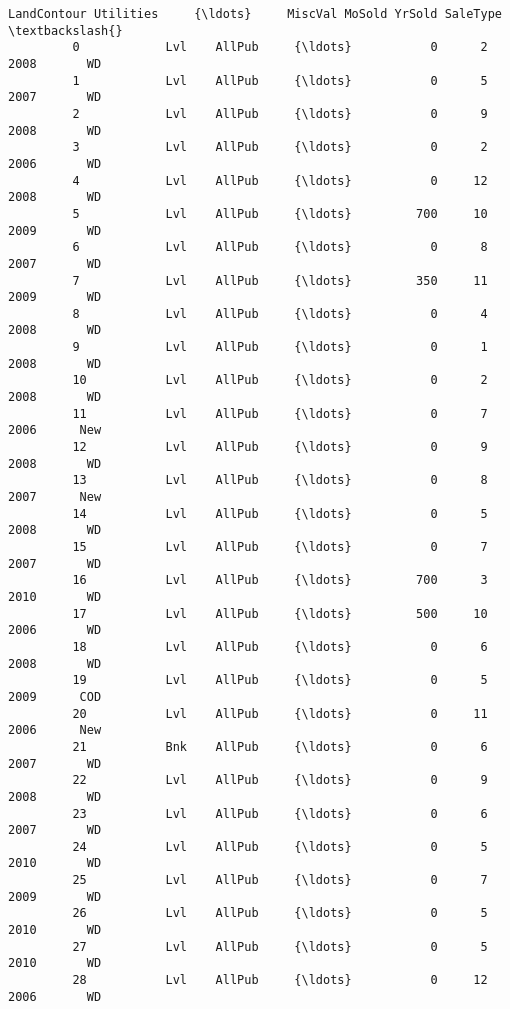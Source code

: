 \documentclass[11pt]{article}
\begin{document}
\begin{Verbatim}[commandchars=\\\{\}]
              LandContour Utilities     {\ldots}     MiscVal MoSold YrSold SaleType  \textbackslash{}
         0            Lvl    AllPub     {\ldots}           0      2   2008       WD   
         1            Lvl    AllPub     {\ldots}           0      5   2007       WD   
         2            Lvl    AllPub     {\ldots}           0      9   2008       WD   
         3            Lvl    AllPub     {\ldots}           0      2   2006       WD   
         4            Lvl    AllPub     {\ldots}           0     12   2008       WD   
         5            Lvl    AllPub     {\ldots}         700     10   2009       WD   
         6            Lvl    AllPub     {\ldots}           0      8   2007       WD   
         7            Lvl    AllPub     {\ldots}         350     11   2009       WD   
         8            Lvl    AllPub     {\ldots}           0      4   2008       WD   
         9            Lvl    AllPub     {\ldots}           0      1   2008       WD   
         10           Lvl    AllPub     {\ldots}           0      2   2008       WD   
         11           Lvl    AllPub     {\ldots}           0      7   2006      New   
         12           Lvl    AllPub     {\ldots}           0      9   2008       WD   
         13           Lvl    AllPub     {\ldots}           0      8   2007      New   
         14           Lvl    AllPub     {\ldots}           0      5   2008       WD   
         15           Lvl    AllPub     {\ldots}           0      7   2007       WD   
         16           Lvl    AllPub     {\ldots}         700      3   2010       WD   
         17           Lvl    AllPub     {\ldots}         500     10   2006       WD   
         18           Lvl    AllPub     {\ldots}           0      6   2008       WD   
         19           Lvl    AllPub     {\ldots}           0      5   2009      COD   
         20           Lvl    AllPub     {\ldots}           0     11   2006      New   
         21           Bnk    AllPub     {\ldots}           0      6   2007       WD   
         22           Lvl    AllPub     {\ldots}           0      9   2008       WD   
         23           Lvl    AllPub     {\ldots}           0      6   2007       WD   
         24           Lvl    AllPub     {\ldots}           0      5   2010       WD   
         25           Lvl    AllPub     {\ldots}           0      7   2009       WD   
         26           Lvl    AllPub     {\ldots}           0      5   2010       WD   
         27           Lvl    AllPub     {\ldots}           0      5   2010       WD   
         28           Lvl    AllPub     {\ldots}           0     12   2006       WD   

\end{Verbatim}
\end{document}
